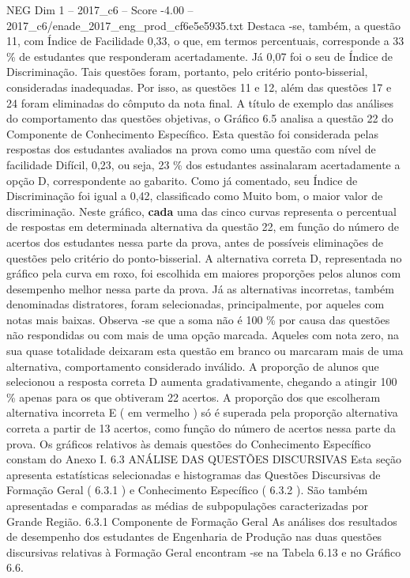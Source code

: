 \begin{textsample}{NEG Dim 1 – 2017\_c6 – Score -4.00 – 2017\_c6/enade\_2017\_eng\_prod\_cf6e5e5935.txt}
Destaca -se, também, a questão 11, com Índice de Facilidade 0,33, o que, em termos percentuais, corresponde a 33 \% de estudantes que responderam acertadamente.
Já 0,07 foi o seu de Índice de Discriminação.
Tais questões foram, portanto, pelo critério ponto-bisserial, consideradas inadequadas.
Por isso, as questões 11 e 12, além das questões 17 e 24 foram eliminadas do cômputo da nota final.
A título de exemplo das análises do comportamento das questões objetivas, o Gráfico 6.5 analisa a questão 22 do Componente de Conhecimento Específico.
Esta questão foi considerada pelas respostas dos estudantes avaliados na prova como uma questão com nível de facilidade Difícil, 0,23, ou seja, 23 \% dos estudantes assinalaram acertadamente a opção D, correspondente ao gabarito.
Como já comentado, seu Índice de Discriminação foi igual a 0,42, classificado como Muito bom, o maior valor de discriminação.
Neste gráfico, \textbf{cada} uma das cinco curvas representa o percentual de respostas em determinada alternativa da questão 22, em função do número de acertos dos estudantes nessa parte da prova, antes de possíveis eliminações de questões pelo critério do ponto-bisserial.
A alternativa correta D, representada no gráfico pela curva em roxo, foi escolhida em maiores proporções pelos alunos com desempenho melhor nessa parte da prova.
Já as alternativas incorretas, também denominadas distratores, foram selecionadas, principalmente, por aqueles com notas mais baixas.
Observa -se que a soma não é 100 \% por causa das questões não respondidas ou com mais de uma opção marcada.
Aqueles com nota zero, na sua quase totalidade deixaram esta questão em branco ou marcaram mais de uma alternativa, comportamento considerado inválido.
A proporção de alunos que selecionou a resposta correta D aumenta gradativamente, chegando a atingir 100 \% apenas para os que obtiveram 22 acertos.
A proporção dos que escolheram alternativa incorreta E ( em vermelho ) só é superada pela proporção alternativa correta a partir de 13 acertos, como função do número de acertos nessa parte da prova.
Os gráficos relativos às demais questões do Conhecimento Específico constam do Anexo I. 6.3 ANÁLISE DAS QUESTÕES DISCURSIVAS Esta seção apresenta estatísticas selecionadas e histogramas das Questões Discursivas de Formação Geral ( 6.3.1 ) e Conhecimento Específico ( 6.3.2 ).
São também apresentadas e comparadas as médias de subpopulações caracterizadas por Grande Região. 6.3.1 Componente de Formação Geral As análises dos resultados de desempenho dos estudantes de Engenharia de Produção nas duas questões discursivas relativas à Formação Geral encontram -se na Tabela 6.13 e no Gráfico 6.6.

\end{textsample}
